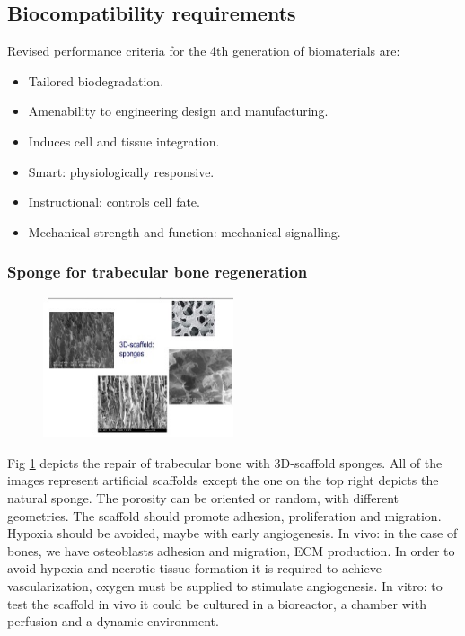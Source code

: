     \subsection{Biocompatibility requirements}
    Revised performance criteria for the 4th generation of biomaterials are:

    \begin{multicols}{2}
        \begin{itemize}
            \item Tailored biodegradation.
            \item Amenability to engineering design and manufacturing.
            \item Induces cell and tissue integration.
            \item Smart: physiologically responsive.
            \item Instructional: controls cell fate.
            \item Mechanical strength and function: mechanical signalling.
        \end{itemize}
    \end{multicols}

        \subsubsection{Sponge for trabecular bone regeneration}
        \begin{figure}[h]
            \centering
            \includegraphics[width=0.5\textwidth]{sponge.jpg}
            \caption{\label{fig:sponge}}
            \end{figure}
        \noindent
        Fig \ref{fig:sponge} depicts the repair of trabecular bone with 3D-scaffold sponges.
        All of the images represent artificial scaffolds except the one on the top right depicts the natural sponge.
        The porosity can be oriented or random, with different geometries.
        The scaffold should promote adhesion, proliferation and migration.
        Hypoxia should be avoided, maybe with early angiogenesis.
        In vivo: in the case of bones, we have osteoblasts adhesion and migration, ECM production.
        In order to avoid hypoxia and necrotic tissue formation it is required to achieve vascularization, oxygen must be supplied to stimulate angiogenesis.
        In vitro: to test the scaffold in vivo it could be cultured in a bioreactor, a chamber with perfusion and a dynamic environment.


